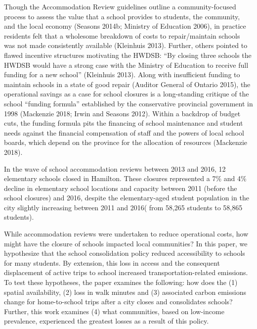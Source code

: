 \documentclass[
default
]{sn-jnl}
\begin{document}
Though the Accommodation Review guidelines outline a community-focused
process to assess the value that a school provides to students, the
community, and the local economy (Seasons 2014b; Ministry of Education
2006), in practice residents felt that a wholesome breakdown of costs to
repair/maintain schools was not made consistently available (Kleinhuis
2013). Further, others pointed to flawed incentive structures motivating
the HWDSB: ``By closing three schools the HWDSB would have a strong case
with the Ministry of Education to receive full funding for a new
school'' (Kleinhuis 2013). Along with insufficient funding to maintain
schools in a state of good repair (Auditor General of Ontario 2015), the
operational savings as a case for school closures is a long-standing
critique of the school ``funding formula'' established by the
conservative provincial government in 1998 (Mackenzie 2018; Irwin and
Seasons 2012). Within a backdrop of budget cuts, the funding formula
pits the financing of school maintenance and student needs against the
financial compensation of staff and the powers of local school boards,
which depend on the province for the allocation of resources (Mackenzie
2018).

In the wave of school accommodation reviews between 2013 and 2016, 12
elementary schools closed in Hamilton. These closures represented a 7\%
and 4\% decline in elementary school locations and capacity between 2011
(before the school closures) and 2016, despite the elementary-aged
student population in the city slightly increasing between 2011 and
2016( from 58,265 students to 58,865 students).

While accommodation reviews were undertaken to reduce operational costs,
how might have the closure of schools impacted local communities? In
this paper, we hypothesize that the school consolidation policy reduced
accessibility to schools for many students. By extension, this loss in
access and the consequent displacement of active trips to school
increased transportation-related emissions. To test these hypotheses,
the paper examines the following: how does the (1) spatial availability,
(2) loss in walk minutes and (3) associated carbon emissions change for
home-to-school trips after a city closes and consolidates schools?
Further, this work examines (4) what communities, based on low-income
prevalence, experienced the greatest losses as a result of this policy.
\end{document}
